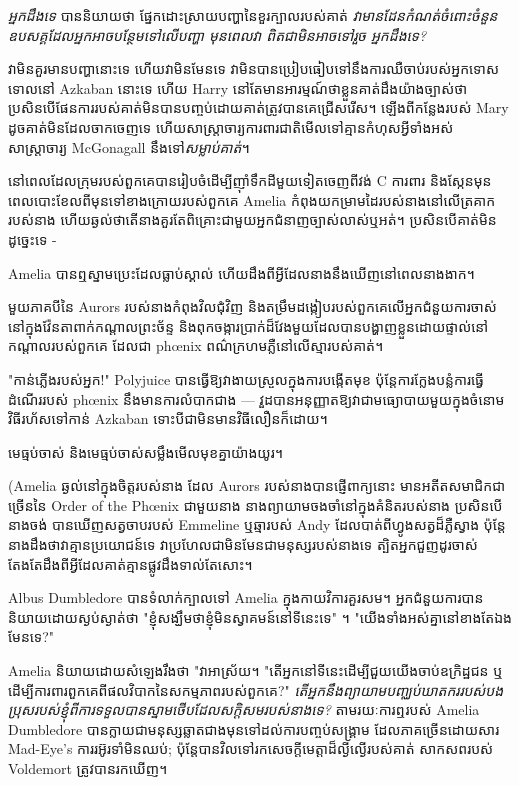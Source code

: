 \emph{អ្នកដឹងទេ} បាននិយាយថា ផ្នែកដោះស្រាយបញ្ហានៃខួរក្បាលរបស់គាត់ \emph{វាមានដែនកំណត់ចំពោះចំនួនឧបសគ្គដែលអ្នកអាចបន្ថែមទៅលើបញ្ហា មុនពេលវា \emph{ពិតជាមិនអាចទៅរួច} អ្នកដឹងទេ? }

វាមិនគួរមានបញ្ហានោះទេ ហើយវាមិនមែនទេ វាមិនបានប្រៀបធៀបទៅនឹងការឈឺចាប់របស់អ្នកទោសទោលនៅ Azkaban នោះទេ ហើយ Harry នៅតែមានអារម្មណ៍ថាខ្លួនគាត់ដឹងយ៉ាងច្បាស់ថា ប្រសិនបើផែនការរបស់គាត់មិនបានបញ្ចប់ដោយគាត់ត្រូវបានគេជ្រើសរើស។ ឡើងពីកន្លែងរបស់ Mary ដូចគាត់មិនដែលចាកចេញទេ ហើយសាស្រ្តាចារ្យការពារជាតិមើលទៅគ្មានកំហុសអ្វីទាំងអស់ សាស្រ្តាចារ្យ McGonagall នឹងទៅ\emph{សម្លាប់គាត់}។

\later

នៅពេលដែលក្រុមរបស់ពួកគេបានរៀបចំដើម្បីញ៉ាំទឹកដីមួយទៀតចេញពីវង់ C ការពារ និងស្កែនមុនពេលបោះខែលពីមុនទៅខាងក្រោយរបស់ពួកគេ Amelia កំពុងយកម្រាមដៃរបស់នាងនៅលើត្រគាករបស់នាង ហើយឆ្ងល់ថាតើនាងគួរតែពិគ្រោះជាមួយអ្នកជំនាញច្បាស់លាស់ឬអត់។ ប្រសិនបើគាត់មិនដូច្នេះទេ -

Amelia បានឮស្នាមប្រេះដែលធ្លាប់ស្គាល់ ហើយដឹងពីអ្វីដែលនាងនឹងឃើញនៅពេលនាងងាក។

មួយភាគបីនៃ Aurors របស់នាងកំពុងវិលជុំវិញ និងតម្រឹមដង្កៀបរបស់ពួកគេលើអ្នកជំនួយការចាស់នៅក្នុងវ៉ែនតាពាក់កណ្តាលព្រះច័ន្ទ និងពុកចង្ការប្រាក់ដ៏វែងមួយដែលបានបង្ហាញខ្លួនដោយផ្ទាល់នៅកណ្តាលរបស់ពួកគេ ដែលជា phœnix ពណ៌ក្រហមភ្លឺនៅលើស្មារបស់គាត់។

"កាន់ភ្លើងរបស់អ្នក!" Polyjuice បានធ្វើឱ្យវាងាយស្រួលក្នុងការបង្កើតមុខ ប៉ុន្តែការក្លែងបន្លំការធ្វើដំណើររបស់ phœnix នឹងមានការលំបាកជាង — វួដបានអនុញ្ញាតឱ្យវាជាមធ្យោបាយមួយក្នុងចំនោមវិធីរហ័សទៅកាន់ Azkaban ទោះបីជាមិនមានវិធីលឿនក៏ដោយ។

មេធ្មប់ចាស់ និងមេធ្មប់ចាស់សម្លឹងមើលមុខគ្នាយ៉ាងយូរ។

(Amelia ឆ្ងល់នៅក្នុងចិត្តរបស់នាង ដែល Aurors របស់នាងបានផ្ញើពាក្យនោះ មានអតីតសមាជិកជាច្រើននៃ Order of the Phœnix ជាមួយនាង នាងព្យាយាមចងចាំនៅក្នុងគំនិតរបស់នាង ប្រសិនបើនាងចង់ បានឃើញសត្វចាបរបស់ Emmeline ឬឆ្មារបស់ Andy ដែលបាត់ពីហ្វូងសត្វដ៏ភ្លឺស្វាង ប៉ុន្តែនាងដឹងថាវាគ្មានប្រយោជន៍ទេ វាប្រហែលជាមិនមែនជាមនុស្សរបស់នាងទេ ត្បិតអ្នកជួញដូរចាស់តែងតែដឹងពីអ្វីដែលគាត់គ្មានផ្លូវដឹងទាល់តែសោះ។

Albus Dumbledore បានទំលាក់ក្បាលទៅ Amelia ក្នុងកាយវិការគួរសម។ អ្នកជំនួយការបាននិយាយដោយស្ងប់ស្ងាត់ថា "ខ្ញុំសង្ឃឹមថាខ្ញុំមិនស្វាគមន៍នៅទីនេះទេ" ។ "យើងទាំងអស់គ្នានៅខាងតែឯងមែនទេ?"

Amelia និយាយដោយសំឡេងរឹងថា "វាអាស្រ័យ។ "តើអ្នកនៅទីនេះដើម្បីជួយយើងចាប់ឧក្រិដ្ឋជន ឬដើម្បីការពារពួកគេពីផលវិបាកនៃសកម្មភាពរបស់ពួកគេ?" \emph{តើ​អ្នក​នឹង​ព្យាយាម​បញ្ឈប់​ឃាតករ​របស់​បង​ប្រុស​របស់​ខ្ញុំ​ពី​ការ​ទទួល​បាន​ស្នាម​ថើប​ដែល​សក្តិសម​របស់​នាង​ទេ?} តាម​រយៈ​ការ​ឮ​របស់ Amelia Dumbledore បាន​ក្លាយ​ជា​មនុស្ស​ឆ្លាត​ជាង​មុន​ទៅ​ដល់​ការ​បញ្ចប់​សង្រ្គាម ដែល​ភាគច្រើន​ដោយសារ Mad-Eye's ការរអ៊ូរទាំមិនឈប់; ប៉ុន្តែ​បាន​វិល​ទៅ​រក​សេចក្តី​មេត្តា​ដ៏​ល្ងីល្ងើ​របស់​គាត់ សាកសព​របស់ Voldemort ត្រូវ​បាន​រក​ឃើញ។

